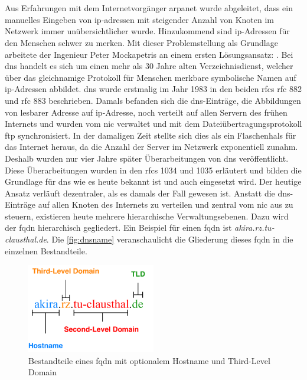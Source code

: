\documentclass[titlepage]{report}
\begin{document}
\section{}
Aus Erfahrungen mit dem Internetvorgänger \gls{arpanet} wurde
abgeleitet, dass ein manuelles Eingeben von \gls{ip}\hyp{}adressen mit
steigender Anzahl von Knoten im Netzwerk immer unübersichtlicher wurde.
Hinzukommend sind \gls{ip}\hyp{}Adressen für den Menschen schwer zu
merken. Mit dieser Problemstellung als Grundlage arbeitete der Ingenieur
Peter Mockapetris an einem ersten Lösungsansatz: .
Bei \gls{dns} handelt es sich um einen mehr als 30 Jahre alten
Verzeichnisdienst, welcher über das gleichnamige Protokoll für Menschen
merkbare symbolische Namen auf \gls{ip}\hyp{}Adressen abbildet.
\gls{dns} wurde erstmalig im Jahr 1983 in den beiden \glspl{rfc}
\gls{rfc} 882\cite{RFC0882} und \gls{rfc} 883\cite{RFC0883} beschrieben.
Damals befanden sich die \gls{dns}\hyp{}Einträge, die Abbildungen von
lesbarer Adresse auf \gls{ip}\hyp{}Adresse, noch verteilt auf
allen Servern des frühen Internets und wurden vom \gls{nic} verwaltet
und mit dem Dateiübertragungsprotokoll \gls{ftp}
synchronisiert\cite{RFC1034}. In der damaligen Zeit stellte sich dies
als ein Flaschenhals für das Internet heraus, da die Anzahl der Server
im Netzwerk exponentiell zunahm. Deshalb wurden nur vier Jahre später
Überarbeitungen von \gls{dns} veröffentlicht. Diese Überarbeitungen
wurden in den \glspl{rfc} 1034 und 1035 erläutert
und bilden die Grundlage für \gls{dns} wie es heute bekannt ist und auch
eingesetzt wird. Der heutige Ansatz verläuft dezentraler, als es damals
der Fall gewesen ist. Anstatt die \gls{dns}\hyp{}Einträge auf allen
Knoten des Internets zu verteilen und zentral vom \gls{nic} aus zu
steuern, existieren heute mehrere hierarchische Verwaltungsebenen. Dazu
wird der \gls{fqdn} hierarchisch gegliedert. Ein Beispiel für einen
\gls{fqdn} ist \emph{akira.rz.tu-clausthal.de}. Die
\autoref{fig:dnsname} veranschaulicht die Gliederung dieses \gls{fqdn} in die
einzelnen Bestandteile.
\begin{figure}[H]
    \centering
    \includegraphics[width=0.5\textwidth]{figures/dnsname.pdf}
    \caption{Bestandteile eines \gls{fqdn} mit optionalem Hostname und Third-Level
    Domain}\label{fig:dnsname}
\end{figure}
\end{document}

